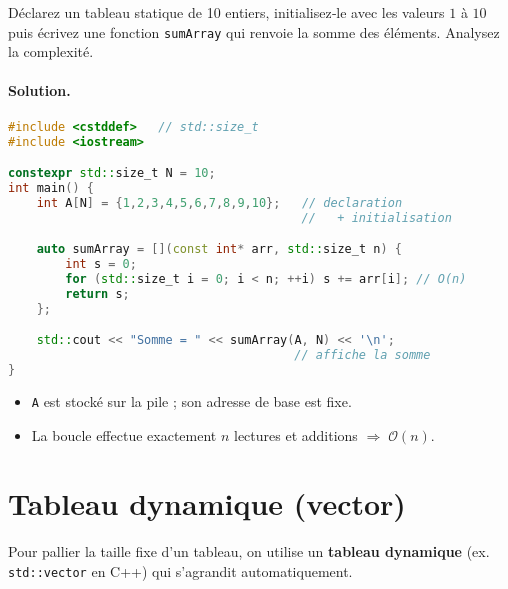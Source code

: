 
\begin{exercice}

Déclarez un tableau statique de 10 entiers, initialisez‐le avec
les valeurs $1$ à $10$ puis écrivez une fonction
\lstinline|sumArray| qui renvoie la somme des éléments.
Analysez la complexité.
\end{exercice}

\paragraph{Solution.}
\begin{lstlisting}[language=C++,caption={array\_sum.cpp}]
#include <cstddef>   // std::size_t
#include <iostream>

constexpr std::size_t N = 10;
int main() {
    int A[N] = {1,2,3,4,5,6,7,8,9,10};   // declaration
                                         //   + initialisation

    auto sumArray = [](const int* arr, std::size_t n) {
        int s = 0;
        for (std::size_t i = 0; i < n; ++i) s += arr[i]; // O(n)
        return s;
    };

    std::cout << "Somme = " << sumArray(A, N) << '\n';
                                        // affiche la somme
}
\end{lstlisting}

\begin{itemize}
  \item \lstinline|A| est stocké sur la pile ; son adresse de base est fixe.
  \item La boucle effectue exactement $n$ lectures et additions
        $\Rightarrow\; \mathcal{O}(n)$.
\end{itemize}

\section{Tableau dynamique (vector)}

Pour pallier la taille fixe d’un tableau, on utilise un
\textbf{tableau dynamique} (ex. \lstinline|std::vector| en C++) qui s’agrandit
automatiquement.


